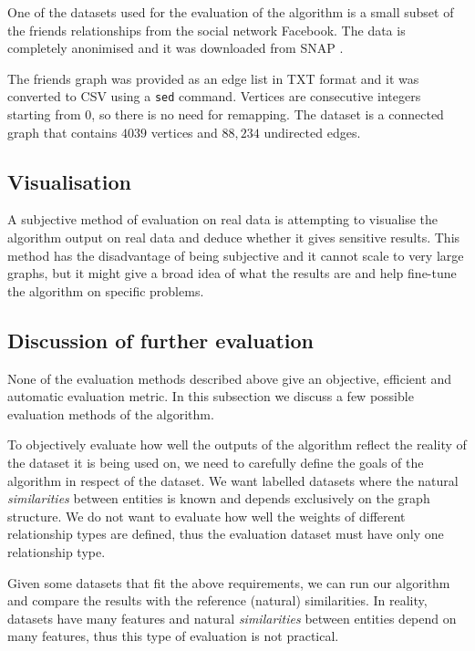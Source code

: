 \documentclass[12pt]{report}
\begin{document}
One of the datasets used for the evaluation of the algorithm is a small subset
of the friends relationships from the social network Facebook. The  data is
completely anonimised and it was downloaded from SNAP \cite{snapnets}.

The friends graph was provided as an edge list in TXT format and it was converted
to CSV using a {\tt sed} command. Vertices are consecutive integers starting
from 0, so there is no need for remapping. The dataset is a connected graph that
contains $4039$ vertices and $88,234$ undirected edges.


%
\subsection{Visualisation}
%
A subjective method of evaluation on real data is attempting to visualise the
algorithm output on real data and deduce whether it gives sensitive results.
This method has the disadvantage of being subjective and it cannot scale to very
large graphs, but it might give a broad idea of what the results are and help
fine-tune the algorithm on specific problems.


%
\subsection{Discussion of further evaluation}
%
None of the evaluation methods described above give an objective, efficient and
automatic evaluation metric. In this subsection we discuss a few possible evaluation
methods of the algorithm.


To objectively evaluate how well the outputs of the algorithm reflect the reality
of the dataset it is being used on, we need to carefully define the goals of the
algorithm in respect of the dataset. We want labelled datasets where the natural
\textit{similarities} between entities is known and depends exclusively on the
graph structure. We do not want to evaluate how well the weights of different
relationship types are defined, thus the evaluation dataset must have only one
relationship type.


Given some datasets that fit the above requirements, we can run our algorithm and
compare the results with the reference (natural) similarities. In reality, datasets
have many features and natural \textit{similarities} between entities depend on many
features, thus this type of evaluation is not practical.
\end{document}
